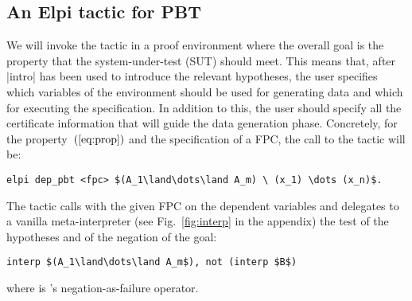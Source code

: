 \subsection{An Elpi tactic for PBT}
\label{ssec:dep_pbt}
We will invoke the tactic in a proof environment where the overall
goal is %
the property that the system-under-test (SUT) should meet. This means that,
after \lsti|intro| has been used to introduce the relevant hypotheses,
the user 
specifies which variables of the environment should be used for
generating data and which for executing the specification. In addition
to this, the user should specify all the certificate information that
will guide the data generation phase. %
Concretely, for the property~$(\ref{eq:prop})$
and the specification of a FPC, the call to the tactic will be:
\begin{lstlisting}
elpi dep_pbt <fpc> $(A_1\land\dots\land A_m) \ (x_1) \dots (x_n)$.
\end{lstlisting}
The tactic calls  with the given FPC on the dependent
variables and delegates to  a vanilla meta-interpreter (see
Fig.~\ref{fig:interp} in the appendix) the  test of the hypotheses and of the negation of the
goal:
\begin{lstlisting}
interp $(A_1\land\dots\land A_m$), not (interp $B$)
\end{lstlisting}
where  is \lP's negation-as-failure operator.

